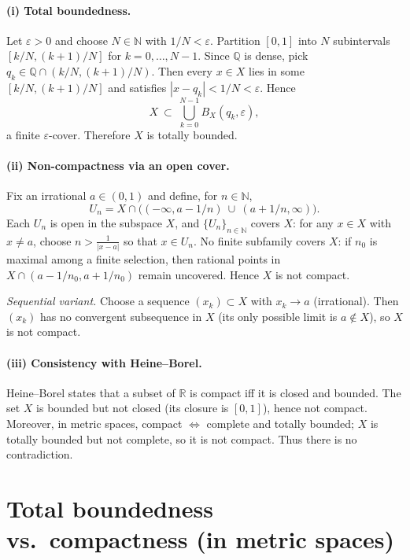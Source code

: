 \documentclass[12pt,a4paper]{article}
\begin{document}
\paragraph{(i) Total boundedness.}
Let $\varepsilon>0$ and choose $N\in\mathbb{N}$ with $1/N<\varepsilon$. Partition $[0,1]$ into $N$ subintervals
$[k/N,(k+1)/N]$ for $k=0,\dots,N-1$. Since $\mathbb{Q}$ is dense, pick $q_k\in\mathbb{Q}\cap(k/N,(k+1)/N)$.
Then every $x\in X$ lies in some $[k/N,(k+1)/N]$ and satisfies $|x-q_k|<1/N<\varepsilon$. Hence
\[
X\ \subset\ \bigcup_{k=0}^{N-1} B_X(q_k,\varepsilon),
\]
a finite $\varepsilon$-cover. Therefore $X$ is totally bounded.

\paragraph{(ii) Non-compactness via an open cover.}
Fix an irrational $a\in(0,1)$ and define, for $n\in\mathbb{N}$,
\[
U_n = X \cap\Big( (-\infty,a-1/n)\ \cup\ (a+1/n,\infty)\Big).
\]
Each $U_n$ is open in the subspace $X$, and $\{U_n\}_{n\in\mathbb{N}}$ covers $X$:
for any $x\in X$ with $x\ne a$, choose $n>\frac1{|x-a|}$ so that $x\in U_n$.
No finite subfamily covers $X$: if $n_0$ is maximal among a finite selection, then rational points in
$X\cap(a-1/n_0,a+1/n_0)$ remain uncovered. Hence $X$ is not compact.

\emph{Sequential variant.} Choose a sequence $(x_k)\subset X$ with $x_k\to a$ (irrational).
Then $(x_k)$ has no convergent subsequence in $X$ (its only possible limit is $a\notin X$), so $X$ is not compact.

\paragraph{(iii) Consistency with Heine--Borel.}
Heine--Borel states that a subset of $\mathbb{R}$ is compact iff it is closed and bounded.
The set $X$ is bounded but not closed (its closure is $[0,1]$), hence not compact. Moreover, in metric spaces,
compact $\iff$ complete and totally bounded; $X$ is totally bounded but not complete, so it is not compact.
Thus there is no contradiction.

\section*{Total boundedness vs.\ compactness (in metric spaces)}
\end{document}

